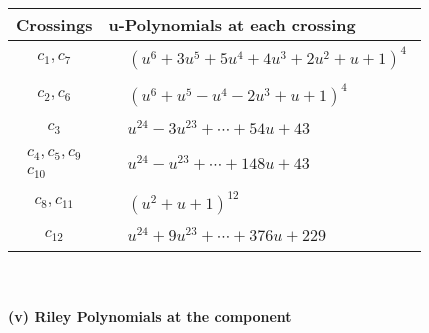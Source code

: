 \documentclass[1p]{elsarticle_modified}
\theoremstyle{definition}
\begin{document}
\begin{tabular}{m{50pt}|m{274pt}}
Crossings & \hspace{64pt}u-Polynomials at each crossing \\
\hline $$\begin{aligned}c_{1},c_{7}\end{aligned}$$&$\begin{aligned}
&(u^6+3 u^5+5 u^4+4 u^3+2 u^2+u+1)^4
\end{aligned}$\\
\hline $$\begin{aligned}c_{2},c_{6}\end{aligned}$$&$\begin{aligned}
&(u^6+u^5- u^4-2 u^3+u+1)^4
\end{aligned}$\\
\hline $$\begin{aligned}c_{3}\end{aligned}$$&$\begin{aligned}
&u^{24}-3 u^{23}+\cdots+54 u+43
\end{aligned}$\\
\hline $$\begin{aligned}c_{4},c_{5},c_{9}\\c_{10}\end{aligned}$$&$\begin{aligned}
&u^{24}- u^{23}+\cdots+148 u+43
\end{aligned}$\\
\hline $$\begin{aligned}c_{8},c_{11}\end{aligned}$$&$\begin{aligned}
&(u^2+u+1)^{12}
\end{aligned}$\\
\hline $$\begin{aligned}c_{12}\end{aligned}$$&$\begin{aligned}
&u^{24}+9 u^{23}+\cdots+376 u+229
\end{aligned}$\\
\hline
\end{tabular}\\~\\
\newpage\renewcommand{\arraystretch}{1}
\flushleft \textbf{(v) Riley Polynomials at the component}\newline \\
\end{document}
